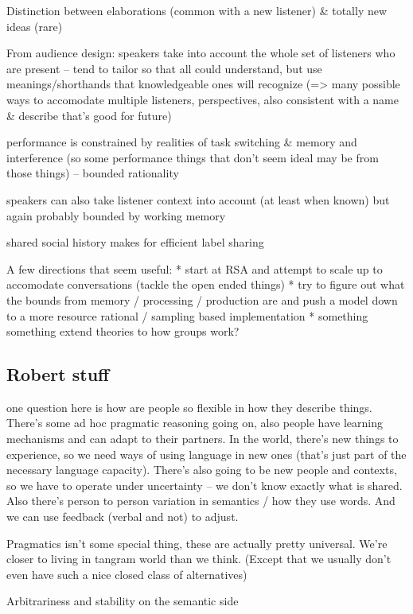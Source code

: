 \documentclass[]{article}
\begin{document}
Distinction between elaborations (common with a new listener) \& totally new ideas (rare)

From audience design: speakers take into account the whole set of listeners who are present -- tend to tailor so that all could understand, but use meanings/shorthands that knowledgeable ones will recognize (=> many possible ways to accomodate multiple listeners, perspectives, also consistent with a name \& describe that's good for future) 

performance is constrained by realities of task switching \& memory and interference (so some performance things that don't seem ideal may be from those things) -- bounded rationality 

speakers can also take listener context into account (at least when known) but again probably bounded by working memory

shared social history makes for efficient label sharing 

A few directions that seem useful:
* start at RSA and attempt to scale up to accomodate conversations (tackle the open ended things)
* try to figure out what the bounds from memory / processing / production are and push a model down to a more resource rational / sampling based implementation
* something something extend theories to how groups work?

\subsection{Robert stuff} 

\cite{hawkins2020b} one question here is how are people so flexible in how they describe things. There's some ad hoc pragmatic reasoning going on, also people have learning mechanisms and can adapt to their partners. In the world, there's new things to experience, so we need ways of using language in new ones (that's just part of the necessary language capacity). There's also going to be new people and contexts, so we have to operate under uncertainty -- we don't know exactly what is shared. Also there's person to person variation in semantics / how they use words. And we can use feedback (verbal and not) to adjust. 

Pragmatics isn't some special thing, these are actually pretty universal. We're closer to living in tangram world than we think. (Except that we usually don't even have such a nice closed class of alternatives) 

Arbitrariness and stability on the semantic side 
\end{document}
